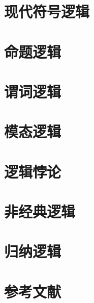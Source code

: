 \documentclass[a4paper,11pt,twoside]{book}
\begin{document}
\chapter{现代符号逻辑}
 
 







\chapter{命题逻辑}





\chapter{谓词逻辑}







\chapter{模态逻辑}




\chapter{逻辑悖论}




\chapter{非经典逻辑}








\chapter{归纳逻辑}








\backmatter
\chapter*{参考文献}
\printbibliography
\end{document}
